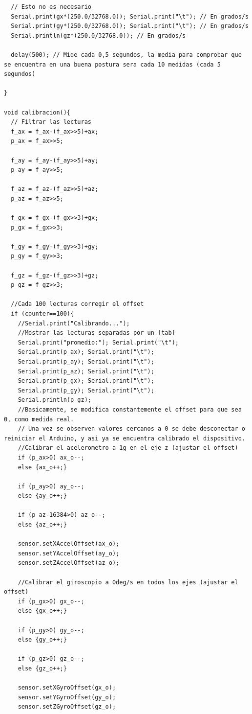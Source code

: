 \begin{lstlisting}
  // Esto no es necesario
  Serial.print(gx*(250.0/32768.0)); Serial.print("\t"); // En grados/s
  Serial.print(gy*(250.0/32768.0)); Serial.print("\t"); // En grados/s 
  Serial.println(gz*(250.0/32768.0)); // En grados/s

  delay(500); // Mide cada 0,5 segundos, la media para comprobar que se encuentra en una buena postura sera cada 10 medidas (cada 5 segundos)

}

void calibracion(){
  // Filtrar las lecturas 
  f_ax = f_ax-(f_ax>>5)+ax; 
  p_ax = f_ax>>5; 

  f_ay = f_ay-(f_ay>>5)+ay; 
  p_ay = f_ay>>5; 

  f_az = f_az-(f_az>>5)+az; 
  p_az = f_az>>5; 

  f_gx = f_gx-(f_gx>>3)+gx; 
  p_gx = f_gx>>3; 

  f_gy = f_gy-(f_gy>>3)+gy; 
  p_gy = f_gy>>3; 

  f_gz = f_gz-(f_gz>>3)+gz; 
  p_gz = f_gz>>3; 
  
  //Cada 100 lecturas corregir el offset 
  if (counter==100){ 
    //Serial.print("Calibrando...");
    //Mostrar las lecturas separadas por un [tab] 
    Serial.print("promedio:"); Serial.print("\t"); 
    Serial.print(p_ax); Serial.print("\t"); 
    Serial.print(p_ay); Serial.print("\t"); 
    Serial.print(p_az); Serial.print("\t"); 
    Serial.print(p_gx); Serial.print("\t"); 
    Serial.print(p_gy); Serial.print("\t"); 
    Serial.println(p_gz); 
    //Basicamente, se modifica constantemente el offset para que sea 0, como medida real. 
    // Una vez se observen valores cercanos a 0 se debe desconectar o reiniciar el Arduino, y asi ya se encuentra calibrado el dispositivo. 
    //Calibrar el acelerometro a 1g en el eje z (ajustar el offset) 
    if (p_ax>0) ax_o--; 
    else {ax_o++;} 
    
    if (p_ay>0) ay_o--; 
    else {ay_o++;} 
    
    if (p_az-16384>0) az_o--; 
    else {az_o++;} 
    
    sensor.setXAccelOffset(ax_o); 
    sensor.setYAccelOffset(ay_o); 
    sensor.setZAccelOffset(az_o); 
    
    //Calibrar el giroscopio a 0deg/s en todos los ejes (ajustar el offset) 
    if (p_gx>0) gx_o--; 
    else {gx_o++;} 
    
    if (p_gy>0) gy_o--; 
    else {gy_o++;} 
    
    if (p_gz>0) gz_o--; 
    else {gz_o++;} 

    sensor.setXGyroOffset(gx_o); 
    sensor.setYGyroOffset(gy_o); 
    sensor.setZGyroOffset(gz_o);
    

\end{lstlisting}
